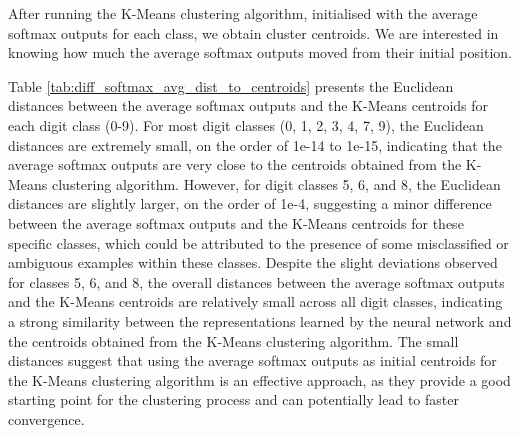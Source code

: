 After running the K-Means clustering algorithm, initialised with the  average softmax outputs for each class, we obtain cluster centroids. We are interested in knowing how much the average softmax outputs moved from their initial position. 

Table \ref{tab:diff_softmax_avg_dist_to_centroids} presents the Euclidean distances between the average softmax outputs and the K-Means centroids for each digit class (0-9). For most digit classes (0, 1, 2, 3, 4, 7, 9), the Euclidean distances are extremely small, on the order of 1e-14 to 1e-15, indicating that the average softmax outputs are very close to the centroids obtained from the K-Means clustering algorithm. However, for digit classes 5, 6, and 8, the Euclidean distances are slightly larger, on the order of 1e-4, suggesting a minor difference between the average softmax outputs and the K-Means centroids for these specific classes, which could be attributed to the presence of some misclassified or ambiguous examples within these classes.
Despite the slight deviations observed for classes 5, 6, and 8, the overall distances between the average softmax outputs and the K-Means centroids are relatively small across all digit classes, indicating a strong similarity between the representations learned by the neural network and the centroids obtained from the K-Means clustering algorithm. The small distances suggest that using the average softmax outputs as initial centroids for the K-Means clustering algorithm is an effective approach, as they provide a good starting point for the clustering process and can potentially lead to faster convergence.



